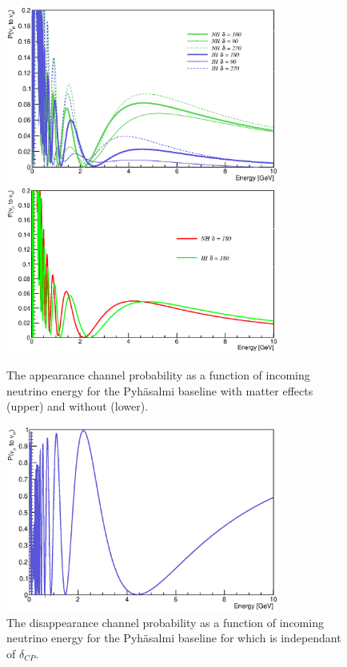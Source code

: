 \begin{figure}[htbp]
\begin{center}
\includegraphics[width=90mm]{Chapter2/figures/numu_nue_matter_effects.eps}
\includegraphics[width=90mm]{Chapter2/figures/numu_nue_no_matter_effects.eps}
\caption{The appearance channel probability as a function of incoming neutrino energy for the Pyh\"asalmi baseline with matter effects (upper) and without (lower).}
\label{fig:baselineProbFig}
\end{center}
\end{figure}

\begin{figure}[htbp]
\begin{center}
\includegraphics[width=90mm]{Chapter2/figures/numu_numu.eps}
\caption{The disappearance channel probability as a function of incoming neutrino energy for the Pyh\"asalmi baseline for which is independant of $\delta_{CP}$.}
\label{fig:baselineProb2Fig}
\end{center}
\end{figure}


